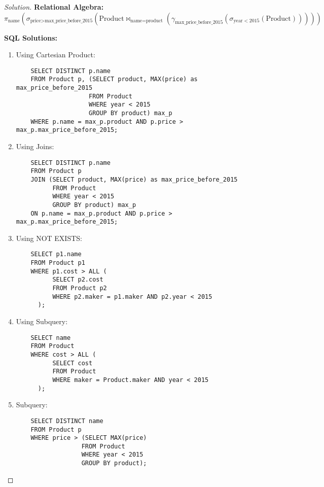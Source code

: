 \documentclass[10pt]{article}
\begin{document}
\begin{proof}[Solution]
\textbf{Relational Algebra:}
\[
\pi_{\text{name}}\left(\sigma_{\text{price} > \text{max\_price\_before\_2015}}(\text{Product} \bowtie_{\text{name} = \text{product}} (\gamma_{\text{max\_price\_before\_2015}}(\sigma_{\text{year} < 2015}(\text{Product}))))
\right)
\]

\textbf{SQL Solutions:}
\begin{enumerate}
    \item Using Cartesian Product:
    \begin{verbatim}
    SELECT DISTINCT p.name
    FROM Product p, (SELECT product, MAX(price) as max_price_before_2015
                    FROM Product
                    WHERE year < 2015
                    GROUP BY product) max_p
    WHERE p.name = max_p.product AND p.price > max_p.max_price_before_2015;
    \end{verbatim}
    
    \item Using Joins:
    \begin{verbatim}
    SELECT DISTINCT p.name
    FROM Product p
    JOIN (SELECT product, MAX(price) as max_price_before_2015
          FROM Product
          WHERE year < 2015
          GROUP BY product) max_p
    ON p.name = max_p.product AND p.price > max_p.max_price_before_2015;
    \end{verbatim}

    \item Using NOT EXISTS:
    \begin{verbatim}
    SELECT p1.name
    FROM Product p1
    WHERE p1.cost > ALL (
          SELECT p2.cost
          FROM Product p2
          WHERE p2.maker = p1.maker AND p2.year < 2015
      );
    \end{verbatim}
    
    \item Using Subquery:
    \begin{verbatim}
    SELECT name
    FROM Product
    WHERE cost > ALL (
          SELECT cost
          FROM Product
          WHERE maker = Product.maker AND year < 2015
      );
    \end{verbatim}
    
    \item Subquery:
    \begin{verbatim}
    SELECT DISTINCT name
    FROM Product p
    WHERE price > (SELECT MAX(price)
                  FROM Product
                  WHERE year < 2015
                  GROUP BY product);
    \end{verbatim}
\end{enumerate}
\end{proof}
\end{document}
